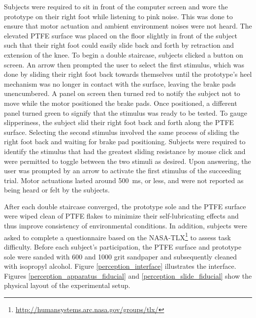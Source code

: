 \documentclass [12pt,letterpaper]{report}
\begin{document}
Subjects were required to sit in front of the computer screen and wore the prototype on their right foot while listening to pink noise. This was done to ensure that motor actuation and ambient environment noises were not heard. The elevated PTFE surface was placed on the floor slightly in front of the subject such that their right foot could easily slide back and forth by retraction and extension of the knee. To begin a double staircase, subjects clicked a button on screen. An arrow then prompted the user to select the first stimulus, which was done by sliding their right foot back towards themselves until the prototype's heel mechanism was no longer in contact with the surface, leaving the brake pads unencumbered. A panel on screen then turned red to notify the subject not to move while the motor positioned the brake pads. Once positioned, a different panel turned green to signify that the stimulus was ready to be tested. To gauge slipperiness, the subject slid their right foot back and forth along the PTFE surface. Selecting the second stimulus involved the same process of sliding the right foot back and waiting for brake pad positioning. Subjects were required to identify the stimulus that had the greatest sliding resistance by mouse click and were permitted to toggle between the two stimuli as desired. Upon answering, the user was prompted by an arrow to activate the first stimulus of the succeeding trial. Motor actuations lasted around 500~ms, or less, and were not reported as being heard or felt by the subjects.

After each double staircase converged, the prototype sole and the PTFE surface were wiped clean of PTFE flakes to minimize their self-lubricating effects and thus improve consistency of environmental conditions. In addition, subjects were asked to complete a questionnaire based on the NASA-TLX\footnote{\url{http://humansystems.arc.nasa.gov/groups/tlx/}} to assess task difficulty. Before each subject's participation, the PTFE surface and prototype sole were sanded with 600 and 1000 grit sandpaper and subsequently cleaned with isopropyl alcohol. Figure \ref{perception_interface} illustrates the interface. Figures \ref{perception_apparatus_fiducial} and \ref{perception_slide_fiducial} show the physical layout of the experimental setup. 
\end{document}

